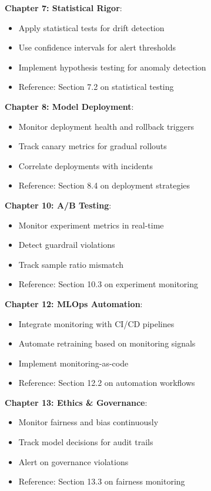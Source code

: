 \textbf{Chapter 7: Statistical Rigor}:
\begin{itemize}
    \item Apply statistical tests for drift detection
    \item Use confidence intervals for alert thresholds
    \item Implement hypothesis testing for anomaly detection
    \item Reference: Section 7.2 on statistical testing
\end{itemize}

\textbf{Chapter 8: Model Deployment}:
\begin{itemize}
    \item Monitor deployment health and rollback triggers
    \item Track canary metrics for gradual rollouts
    \item Correlate deployments with incidents
    \item Reference: Section 8.4 on deployment strategies
\end{itemize}

\textbf{Chapter 10: A/B Testing}:
\begin{itemize}
    \item Monitor experiment metrics in real-time
    \item Detect guardrail violations
    \item Track sample ratio mismatch
    \item Reference: Section 10.3 on experiment monitoring
\end{itemize}

\textbf{Chapter 12: MLOps Automation}:
\begin{itemize}
    \item Integrate monitoring with CI/CD pipelines
    \item Automate retraining based on monitoring signals
    \item Implement monitoring-as-code
    \item Reference: Section 12.2 on automation workflows
\end{itemize}

\textbf{Chapter 13: Ethics \& Governance}:
\begin{itemize}
    \item Monitor fairness and bias continuously
    \item Track model decisions for audit trails
    \item Alert on governance violations
    \item Reference: Section 13.3 on fairness monitoring
\end{itemize}


